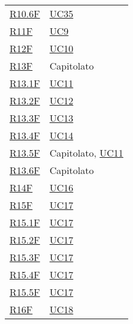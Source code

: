 \begin{center}
\begin{longtable}[!h]{p{50px} p{50px}}
        \hyperref[tab:RequisitiFunzionali]{R10.6F} & \hyperref[sec:UC35]{UC35}                      \\
        \hyperref[tab:RequisitiFunzionali]{R11F}   & \hyperref[sec:UC9]{UC9}                        \\
        \hyperref[tab:RequisitiFunzionali]{R12F}   & \hyperref[sec:UC10]{UC10}                      \\
        \hyperref[tab:RequisitiFunzionali]{R13F}   & Capitolato                                     \\
        \hyperref[tab:RequisitiFunzionali]{R13.1F} & \hyperref[sec:UC11]{UC11}                      \\
        \hyperref[tab:RequisitiFunzionali]{R13.2F} & \hyperref[sec:UC12]{UC12}                      \\
        \hyperref[tab:RequisitiFunzionali]{R13.3F} & \hyperref[sec:UC13]{UC13}                      \\
        \hyperref[tab:RequisitiFunzionali]{R13.4F} & \hyperref[sec:UC14]{UC14}                      \\
        \hyperref[tab:RequisitiFunzionali]{R13.5F} & Capitolato, \newline \hyperref[sec:UC11]{UC11} \\
        \hyperref[tab:RequisitiFunzionali]{R13.6F} & Capitolato                                     \\
        \hyperref[tab:RequisitiFunzionali]{R14F}   & \hyperref[sec:UC16]{UC16}                      \\
        \hyperref[tab:RequisitiFunzionali]{R15F}   & \hyperref[sec:UC17]{UC17}                      \\
        \hyperref[tab:RequisitiFunzionali]{R15.1F} & \hyperref[sec:UC17]{UC17}                      \\
        \hyperref[tab:RequisitiFunzionali]{R15.2F} & \hyperref[sec:UC17]{UC17}                      \\
        \hyperref[tab:RequisitiFunzionali]{R15.3F} & \hyperref[sec:UC17]{UC17}                      \\
        \hyperref[tab:RequisitiFunzionali]{R15.4F} & \hyperref[sec:UC17]{UC17}                      \\
        \hyperref[tab:RequisitiFunzionali]{R15.5F} & \hyperref[sec:UC17]{UC17}                      \\
        \hyperref[tab:RequisitiFunzionali]{R16F}   & \hyperref[sec:UC18]{UC18}                      \\

\end{longtable}
\end{center}
